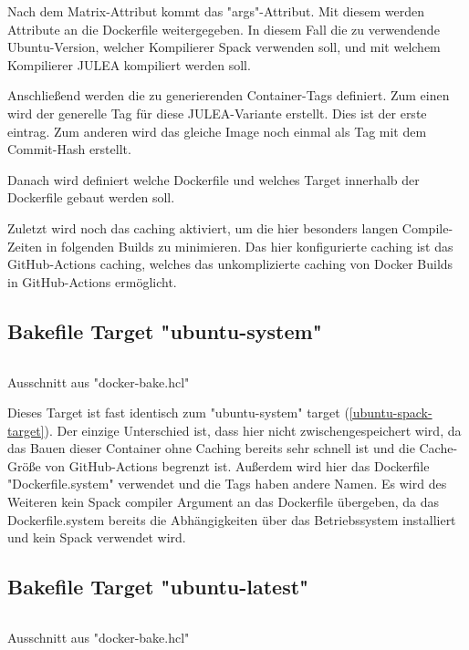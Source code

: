 Nach dem Matrix-Attribut kommt das "args"-Attribut. Mit diesem werden Attribute an die Dockerfile weitergegeben. In diesem Fall die zu verwendende Ubuntu-Version, welcher Kompilierer Spack verwenden soll, und mit welchem Kompilierer JULEA kompiliert werden soll. 

Anschließend werden die zu generierenden Container-Tags definiert. Zum einen wird der generelle Tag für diese JULEA-Variante erstellt. Dies ist der erste eintrag. Zum anderen wird das gleiche Image noch einmal als Tag mit dem Commit-Hash erstellt.

Danach wird definiert welche Dockerfile und welches Target innerhalb der Dockerfile gebaut werden soll. 

Zuletzt wird noch das caching aktiviert, um die hier besonders langen Compile-Zeiten in folgenden Builds zu minimieren. Das hier konfigurierte caching ist das GitHub-Actions caching, welches das unkomplizierte caching von Docker Builds in GitHub-Actions ermöglicht.

\subsection{Bakefile Target "ubuntu-system"} \label{ubuntu-system-target}

\begin{listing}[H]
    \inputminted[firstline=30,lastline=44]{./lexers/docker-bake-lexer.py}{./code-examples/docker-bake.hcl}
    \caption{Ausschnitt aus "docker-bake.hcl"}
\end{listing}

Dieses Target ist fast identisch zum "ubuntu-system" target (\cref{ubuntu-spack-target}). Der einzige Unterschied ist, dass hier nicht zwischengespeichert wird, da das Bauen dieser Container ohne Caching bereits sehr schnell ist und die Cache-Größe von GitHub-Actions begrenzt ist. Außerdem wird hier das Dockerfile "Dockerfile.system" verwendet und die Tags haben andere Namen. Es wird des Weiteren kein Spack compiler Argument an das Dockerfile übergeben, da das Dockerfile.system bereits die Abhängigkeiten über das Betriebssystem installiert und kein Spack verwendet wird. 


\subsection{Bakefile Target "ubuntu-latest"}

\begin{listing}[H]
    \inputminted[firstline=47,lastline=56]{./lexers/docker-bake-lexer.py}{./code-examples/docker-bake.hcl}
    \caption{Ausschnitt aus "docker-bake.hcl"}
\end{listing}


